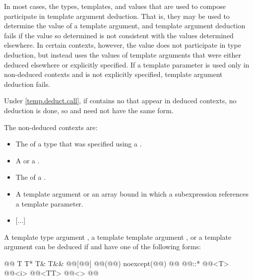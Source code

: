 \documentclass{wg21}
\begin{document}
\pnum
In most cases, the types, templates, and  values that are used
to compose
participate in template argument deduction.
That is,
they may be used to determine the value of a template argument, and
template argument deduction fails if
the value so determined is not consistent with the values determined
elsewhere.
In certain contexts, however, the value does not
participate in type deduction, but instead uses the values of template
arguments that were either deduced elsewhere or explicitly specified.
If a template parameter is used only in non-deduced contexts and is not
explicitly specified, template argument deduction fails.
\begin{note}
    Under \ref{temp.deduct.call},
    if  contains no  that appear
    in deduced contexts, no deduction is done, so  and 
    need not have the same form.
\end{note}

\pnum
The non-deduced contexts are:

%
\begin{itemize}
    \item
    The
    of a type that was specified using a
    .
    \item
    A  or a .
    \item
    The  of a .
    \item
    A  template argument or an array bound in which a subexpression
    references a template parameter.
    \item \textcolor{noteclr}{[...]}
\end{itemize}


\pnum
A template type argument
,
a template template argument 
,
or a template  argument
can be deduced if
and
have one of the following forms:
\begin{codeblock}
    @\opt{\cv{}}@ T
    T*
    T&
    T&&
    @@[@@]
    @@(@@) noexcept(@@)
    @@ @@::*
    @@<T>
    @@<i>
    @@<TT>
    @@<>
    @@
\end{codeblock}
\end{document}
